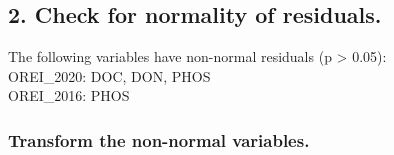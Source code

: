 \documentclass[
]{article}
\newenvironment{Shaded}{\begin{snugshade}}{\end{snugshade}}
\newcommand{\AttributeTok}[1]{\textcolor[rgb]{0.77,0.63,0.00}{#1}}
\newcommand{\CommentTok}[1]{\textcolor[rgb]{0.56,0.35,0.01}{\textit{#1}}}
\newcommand{\ControlFlowTok}[1]{\textcolor[rgb]{0.13,0.29,0.53}{\textbf{#1}}}
\newcommand{\DecValTok}[1]{\textcolor[rgb]{0.00,0.00,0.81}{#1}}
\newcommand{\FunctionTok}[1]{\textcolor[rgb]{0.00,0.00,0.00}{#1}}
\newcommand{\NormalTok}[1]{#1}
\newcommand{\OtherTok}[1]{\textcolor[rgb]{0.56,0.35,0.01}{#1}}
\newcommand{\SpecialCharTok}[1]{\textcolor[rgb]{0.00,0.00,0.00}{#1}}
\begin{document}
\hypertarget{check-for-normality-of-residuals.}{%
\subsection{2. Check for normality of
residuals.}\label{check-for-normality-of-residuals.}}

\begin{Shaded}
\end{Shaded}

The following variables have non-normal residuals (p \textgreater{}
0.05):\\
OREI\_2020: DOC, DON, PHOS\\
OREI\_2016: PHOS

\hypertarget{transform-the-non-normal-variables.}{%
\subsubsection{Transform the non-normal
variables.}\label{transform-the-non-normal-variables.}}
\end{document}

